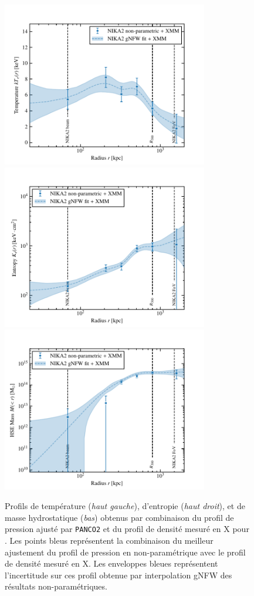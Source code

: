 \begin{figure}[t]
    \centering
    \includegraphics[height=7.2cm, trim={0cm 0cm 1cm 0cm}, clip]{Figures/Chap_panco/demo_plots/temperature.pdf}
    \includegraphics[height=7.2cm, trim={0cm 0cm 1cm 0cm}, clip]{Figures/Chap_panco/demo_plots/entropy.pdf} \\
    \includegraphics[height=7.2cm]{Figures/Chap_panco/demo_plots/mass.pdf}
    \caption{
        Profils de température (\textit{haut gauche}), d'entropie (\textit{haut droit}), et de masse hydrostatique (\textit{bas}) obtenus par combinaison du profil de pression ajusté par \texttt{PANCO2} et du profil de densité mesuré en X pour \act.
        Les points bleus représentent la combinaison du meilleur ajustement du profil de pression en non-paramétrique avec le profil de densité mesuré en X.
        Les enveloppes bleues représentent l'incertitude sur ces profil obtenue par interpolation gNFW des résultats non-paramétriques.
    }
    \label{fig:panco2:actlike_thermo}
\end{figure}

